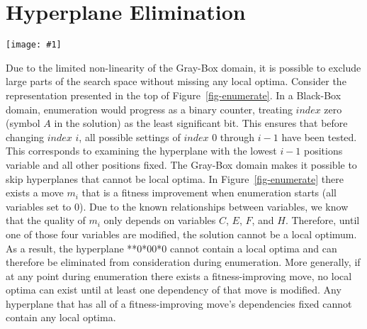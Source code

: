 \documentclass[runningheads,a4paper]{llncs}
\newcommand{\includegraphicsfit}[1]
{\texttt{[image: \#1]}}
\begin{document}
\section{Hyperplane Elimination}
\begin{figure*}
  \centering
  \includegraphicsfit{Enumerate}
  \caption{Example change of enumeration ordering. The gray variables represent all dependencies
           for some move $m_i$. By reordering, $m_i$'s lowest $index$ dependency improves from 2 to 4.}
  \label{fig-enumerate}
\end{figure*}

Due to the limited non-linearity of the Gray-Box domain, it is possible to exclude large
parts of the search space without missing any local optima.
Consider the representation presented in the top of Figure~\ref{fig-enumerate}. In a Black-Box
domain, enumeration would progress as a binary counter, treating $index$ zero (symbol $A$ in the solution) as
the least significant bit. This ensures that before changing $index$ $i$, all possible settings of $index$
0 through $i-1$ have been tested. This corresponds to examining the hyperplane with the lowest $i-1$ positions
variable and all other positions fixed. The Gray-Box domain makes it possible to skip hyperplanes
that cannot be local optima. In Figure~\ref{fig-enumerate} there exists a move $m_i$ that is a fitness improvement
when enumeration starts (all variables set to 0). Due to the known relationships between variables,
we know that the quality of $m_i$ only depends on variables $C$, $E$, $F$, and $H$.
Therefore, until one of those four variables are modified, the solution cannot be a local optimum.
As a result, the hyperplane **0*00*0 cannot contain a local optima and can
therefore be eliminated from consideration during enumeration.
More generally, if at any point during enumeration
there exists a fitness-improving move, no local optima can exist until at least one
dependency of that move is modified. Any hyperplane that has all of a fitness-improving
move's dependencies fixed cannot contain any local optima.
\end{document}

